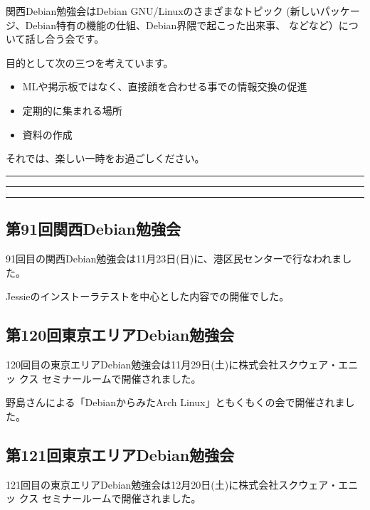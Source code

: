 \documentclass[mingoth,a4paper]{jsarticle}
\begin{document}
 関西Debian勉強会はDebian GNU/Linuxのさまざまなトピック
 (新しいパッケージ、Debian特有の機能の仕組、Debian界隈で起こった出来事、
 などなど）について話し合う会です。

 目的として次の三つを考えています。
 \begin{itemize}
  \item MLや掲示板ではなく、直接顔を合わせる事での情報交換の促進
  \item 定期的に集まれる場所
  \item 資料の作成
 \end{itemize}

 それでは、楽しい一時をお過ごしください。

\newpage

\begin{minipage}[b]{0.2\hsize}
 {}
\end{minipage}
\begin{minipage}[b]{0.8\hsize}
\hrule
\vspace{2mm}
\hrule
\setcounter{tocdepth}{1}
\tableofcontents
\vspace{2mm}
\hrule
\end{minipage}


\subsection{第91回関西Debian勉強会}

91回目の関西Debian勉強会は11月23日(日)に、港区民センターで行なわれました。

Jessieのインストーラテストを中心とした内容での開催でした。

\subsection{第120回東京エリアDebian勉強会}

120回目の東京エリアDebian勉強会は11月29日(土)に株式会社スクウェア・エニッ
クス セミナールームで開催されました。

野島さんによる「DebianからみたArch Linux」ともくもくの会で開催されました。

\subsection{第121回東京エリアDebian勉強会}

121回目の東京エリアDebian勉強会は12月20日(土)に株式会社スクウェア・エニッ
クス セミナールームで開催されました。
\end{document}
